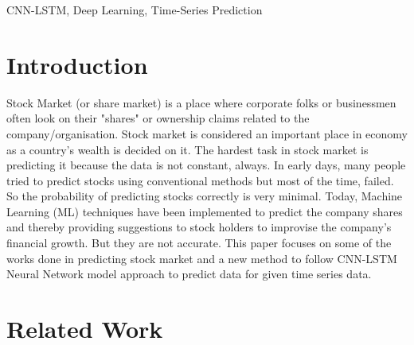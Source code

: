 \documentclass[conference]{IEEEtran}
\begin{document}
\begin{IEEEkeywords}
CNN-LSTM, Deep Learning, Time-Series Prediction
\end{IEEEkeywords}

\section{Introduction}
Stock Market (or share market) is a place where corporate folks or businessmen often look on their "shares" or ownership claims related to the company/organisation. Stock market is considered an important place in economy as a country's wealth is decided on it. The hardest task in stock market is predicting it because the data is not constant, always. In early days, many people tried to predict stocks using conventional methods but most of the time, failed. So the probability of predicting stocks correctly is very minimal. Today, Machine Learning (ML) techniques have been implemented to predict the company shares and thereby providing suggestions to stock holders to improvise the company's financial growth. But they are not accurate. This paper focuses on some of the works done in predicting stock market and a new method to follow CNN-LSTM Neural Network model approach to predict data for given time series data.

\section{Related Work}
\end{document}
